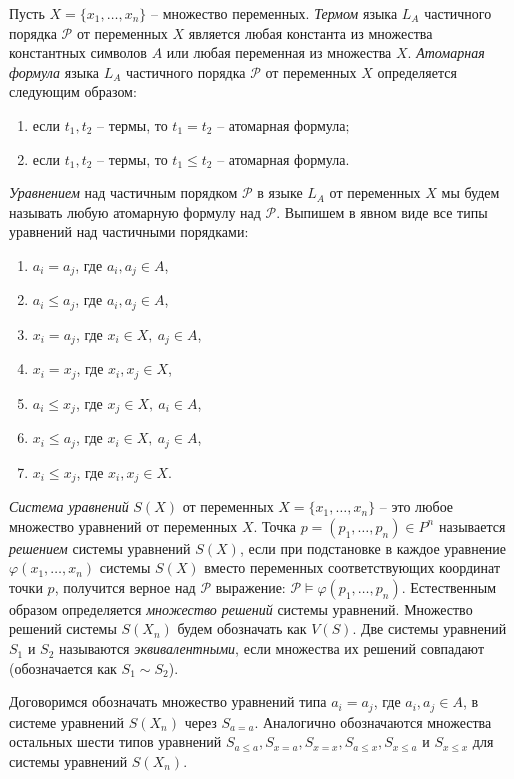 \documentclass[12pt]{article}
\theoremstyle{break}
\def\P{\mathcal{P}}
\begin{document}
		Пусть $X = \{x_1,\dots,x_n\}$ -- множество переменных. \textit{Термом} языка $L_A$ частичного порядка $\P$ от переменных $X$ является любая константа из множества константных символов $A$ или любая переменная из множества $X$. \textit{Атомарная формула} языка $L_A$ частичного порядка $\P$ от переменных $X$ определяется следующим образом:
		\begin{enumerate}
			\item если $t_1, t_2$ -- термы, то $t_1=t_2$ -- атомарная формула;
			\item если $t_1, t_2$ -- термы, то $t_1\leqslant t_2$ -- атомарная формула.
		\end{enumerate}

		\textit{Уравнением} над частичным порядком $\P$ в языке $L_A$ от переменных $X$ мы будем называть любую атомарную формулу над $\P$. Выпишем в явном виде все типы уравнений над частичными порядками:
		\begin{enumerate}
			\item $a_i=a_j$, где $a_i, a_j\in A$,
			\item $a_i\leqslant a_j$, где $a_i, a_j\in A$,
			\item $x_i=a_j$, где $x_i\in X,~a_j\in A$,
			\item $x_i=x_j$, где $x_i, x_j\in X$,
			\item $a_i\leqslant x_j$, где $x_j\in X,~a_i\in A$,
			\item $x_i\leqslant a_j$, где $x_i\in X,~a_j\in A$,
			\item $x_i\leqslant x_j$, где $x_i, x_j\in X$.
		\end{enumerate}

		\textit{Система уравнений} $S(X)$ от переменных $X=\{x_1,\dots,x_n\}$ -- это любое множество уравнений от переменных $X$. Точка $p=(p_1,\dots,p_n)\in P^n$ называется \textit{решением} системы уравнений $S(X)$, если при подстановке в каждое уравнение $\varphi(x_1,\dots,x_n)$ системы $S(X)$ вместо переменных соответствующих координат точки $p$, получится верное над $\P$ выражение: $\P\vDash \varphi(p_1,\dots,p_n)$. Естественным образом определяется \textit{множество решений} системы уравнений. Множество решений системы $S(X_n)$ будем обозначать как $V(S)$. Две системы уравнений $S_1$ и $S_2$ называются \textit{эквивалентными}, если множества их решений совпадают (обозначается как $S_1\sim S_2$).

		Договоримся обозначать множество уравнений типа $a_i=a_j$, где $a_i, a_j\in A$, в системе уравнений $S(X_n)$ через $S_{a=a}$. Аналогично обозначаются множества остальных шести типов уравнений $S_{a\leqslant a}, S_{x=a}, S_{x=x}, S_{a\leqslant x}, S_{x\leqslant a}$ и $ S_{x\leqslant x}$ для системы уравнений $S(X_n)$.
		
\end{document}
